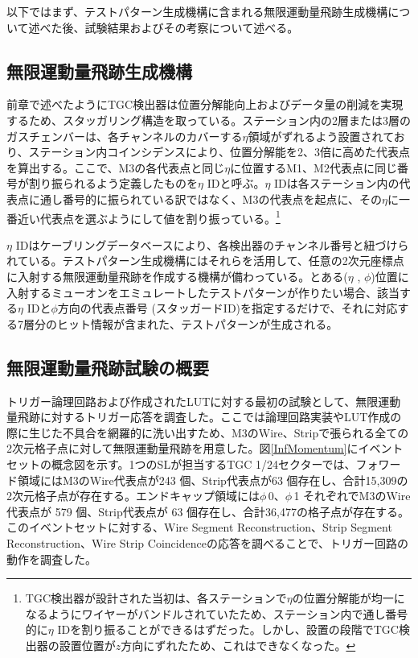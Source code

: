 以下ではまず、テストパターン生成機構に含まれる無限運動量飛跡生成機構について述べた後、試験結果およびその考察について述べる。

\subsection*{無限運動量飛跡生成機構}
\label{subsec_IMT_generation}


前章で述べたようにTGC検出器は位置分解能向上およびデータ量の削減を実現するため、スタッガリング構造を取っている。ステーション内の2層または3層のガスチェンバーは、各チャンネルのカバーする$\eta$領域がずれるよう設置されており、ステーション内コインシデンスにより、位置分解能を2、3倍に高めた代表点を算出する。ここで、M3の各代表点と同じ$\eta$に位置するM1、M2代表点に同じ番号が割り振られるよう定義したものを$\eta$ IDと呼ぶ。$\eta$ IDは各ステーション内の代表点に通し番号的に振られている訳ではなく、M3の代表点を起点に、その$\eta$に一番近い代表点を選ぶようにして値を割り振っている。\footnote{TGC検出器が設計された当初は、各ステーションで$\eta$の位置分解能が均一になるようにワイヤーがバンドルされていたため、ステーション内で通し番号的に$\eta$ IDを割り振ることができるはずだった。しかし、設置の段階でTGC検出器の設置位置が$z$方向にずれたため、これはできなくなった。}


$\eta$ IDはケーブリングデータベースにより、各検出器のチャンネル番号と紐づけられている。テストパターン生成機構にはそれらを活用して、任意の2次元座標点に入射する無限運動量飛跡を作成する機構が備わっている。とある($\eta$ , $\phi$)位置に入射するミューオンをエミュレートしたテストパターンが作りたい場合、該当する$\eta$ IDと$\phi$方向の代表点番号 (スタッガードID)を指定するだけで、それに対応する7層分のヒット情報が含まれた、テストパターンが生成される。


\subsection*{無限運動量飛跡試験の概要}
トリガー論理回路および作成されたLUTに対する最初の試験として、無限運動量飛跡に対するトリガー応答を調査した。ここでは論理回路実装やLUT作成の際に生じた不具合を網羅的に洗い出すため、M3のWire、Stripで張られる全ての2次元格子点に対して無限運動量飛跡を用意した。図\ref{InfMomentum}にイベントセットの概念図を示す。1つのSLが担当するTGC 1/24セクターでは、フォワード領域にはM3のWire代表点が243 個、Strip代表点が63 個存在し、合計15,309の2次元格子点が存在する。エンドキャップ領域には$\phi\,$0、$\phi\,$1 それぞれでM3のWire代表点が 579 個、Strip代表点が 63 個存在し、合計36,477の格子点が存在する。このイベントセットに対する、Wire Segment Reconstruction、Strip Segment Reconstruction、Wire Strip Coincidenceの応答を調べることで、トリガー回路の動作を調査した。



